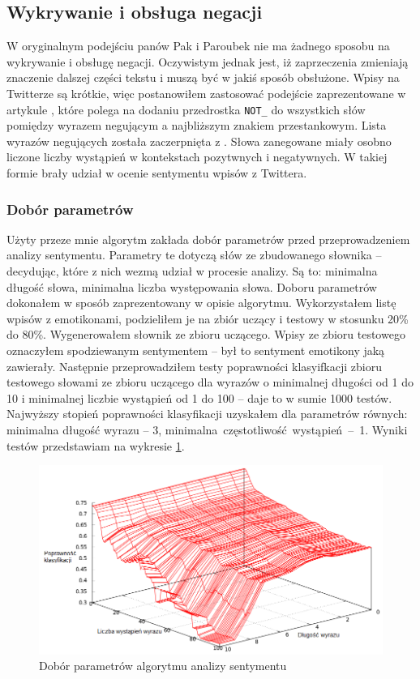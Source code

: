 \subsection{Wykrywanie i obsługa negacji}
\label{subsubsection:wykrywanieiobsluganegacji}
W oryginalnym podejściu panów Pak i Paroubek nie ma żadnego sposobu na
wykrywanie i obsługę negacji. Oczywistym jednak jest, iż zaprzeczenia zmieniają
znaczenie dalszej części tekstu i muszą być w jakiś sposób obsłużone.
Wpisy na Twitterze są krótkie, więc postanowiłem zastosować podejście
zaprezentowane w artykule \cite{thumbsUp2002}, które polega na dodaniu
przedrostka \texttt{NOT\_} do wszystkich słów pomiędzy wyrazem negującym
a najbliższym znakiem przestankowym. Lista wyrazów negujących
została zaczerpnięta z \cite{englishNots1983}. Słowa zanegowane miały osobno
liczone liczby wystąpień w kontekstach pozytwnych i negatywnych. W takiej formie
brały udział w ocenie sentymentu wpisów z Twittera.







\subsubsection{Dobór parametrów}
\label{subsubsection:doborparametrow}
Użyty przeze mnie algorytm zakłada dobór parametrów przed przeprowadzeniem
analizy sentymentu. Parametry te dotyczą słów ze zbudowanego słownika --
decydując, które z nich wezmą udział w procesie analizy. Są to: minimalna
długość słowa, minimalna liczba występowania słowa. Doboru parametrów dokonałem
w sposób zaprezentowany w opisie algorytmu. Wykorzystałem listę wpisów z
emotikonami, podzieliłem je na zbiór uczący i testowy w stosunku 20\% do 80\%.
Wygenerowałem słownik ze zbioru uczącego. Wpisy ze zbioru testowego oznaczyłem spodziewanym
sentymentem -- był to sentyment emotikony jaką zawierały. Następnie
przeprowadziłem testy poprawności klasyifkacji zbioru testowego słowami ze
zbioru uczącego dla wyrazów o minimalnej długości od 1 do 10 i minimalnej
liczbie wystąpień od 1 do 100 -- daje to w sumie 1000 testów.
Najwyższy stopień poprawności klasyfikacji uzyskałem dla parametrów równych:
minimalna długość wyrazu -- 3, \mbox{minimalna częstotliwość wystąpień -- 1}.
Wyniki testów przedstawiam na wykresie
\ref{image:pak-paroubek-parametry}.

\begin{figure}[ht!]
\centering
\includegraphics[width=160mm]{img/pak-paroubek-params_pl.png}
\caption{Dobór parametrów algorytmu analizy sentymentu}
\label{image:pak-paroubek-parametry}
\end{figure}